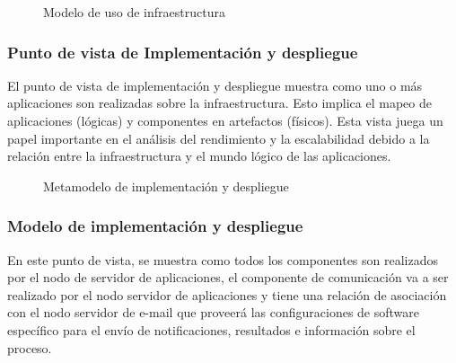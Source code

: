 \begin{figure}[h]
	\centering
	\caption{Modelo de uso de infraestructura}
\end{figure}



\subsubsection{ Punto de vista de Implementación y despliegue}
El punto de vista de implementación y despliegue muestra como uno o más aplicaciones son realizadas sobre la infraestructura. Esto implica el mapeo de aplicaciones (lógicas) y componentes en artefactos (físicos). Esta vista juega un papel importante en el análisis del rendimiento y la escalabilidad debido a la relación entre la infraestructura y el mundo lógico de las aplicaciones.


\begin{figure}[h]
	\centering
	\caption{Metamodelo de implementación y despliegue}
\end{figure}

\subsubsection{Modelo de implementación y despliegue}

En este punto de vista, se muestra como todos los componentes son realizados por el nodo de servidor de aplicaciones, el componente de comunicación va a ser realizado por el nodo servidor de aplicaciones y tiene una relación de asociación con el nodo servidor de e-mail que
proveerá las configuraciones de software específico para el envío de notificaciones, resultados e información sobre el proceso.

